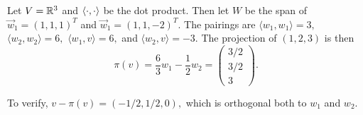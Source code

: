 \begin{example}
Let $V = \mathbb R^3$ and $\langle \cdot, \cdot \rangle$ be the dot product. Then let $W$ be the span of $\vec{w}_1 = (1, 1, 1)^T$ and $\vec{w}_1 = (1, 1, -2)^T.$ The pairings are $\langle w_1, w_1 \rangle = 3,$ $\langle w_2, w_2 \rangle = 6,$ $\langle w_1, v \rangle = 6,$ and $\langle w_2, v \rangle = -3.$ The projection of $(1, 2, 3)$ is then 
\[
\pi(v) = \frac{6}{3}w_1 -\frac{1}{2}w_2 = \begin{pmatrix}3/2 \\ 3/2 \\ 3\end{pmatrix}.
\]

To verify, $v - \pi(v) = (-1/2, 1/2, 0),$ which is orthogonal both to $w_1$ and $w_2.$
\end{example}

\newpage